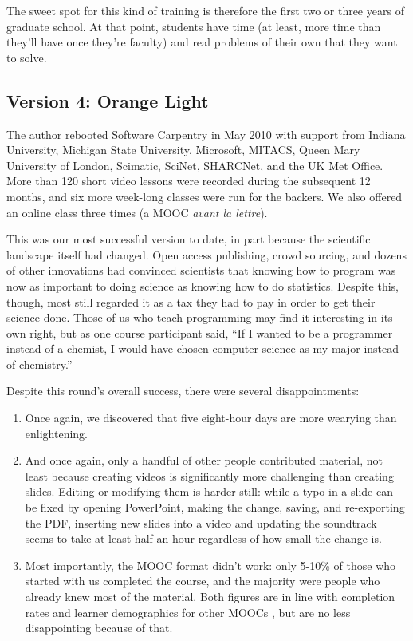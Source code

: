 \documentclass[10pt,a4paper,twocolumn]{article}
\begin{document}
The sweet spot for this kind of training is therefore the first two or
three years of graduate school. At that point, students have time (at
least, more time than they'll have once they're faculty) and real
problems of their own that they want to solve.

\subsection*{Version 4: Orange Light}

The author rebooted Software Carpentry in May 2010 with support from
Indiana University, Michigan State University, Microsoft, MITACS, Queen
Mary University of London, Scimatic, SciNet, SHARCNet, and the UK Met
Office. More than 120 short video lessons were recorded during the
subsequent 12 months, and six more week-long classes were run for the
backers. We also offered an online class three times (a MOOC \emph{avant
la lettre}).

This was our most successful version to date, in part because the
scientific landscape itself had changed. Open access publishing, crowd
sourcing, and dozens of other innovations had convinced scientists
that knowing how to program was now as important to doing science as
knowing how to do statistics. Despite this, though, most still
regarded it as a tax they had to pay in order to get their science
done. Those of us who teach programming may find it interesting in its
own right, but as one course participant said, ``If I wanted to be a
programmer instead of a chemist, I would have chosen computer science
as my major instead of chemistry.''

Despite this round's overall success, there were several
disappointments:

\begin{enumerate}

\item
  Once again, we discovered that five eight-hour days are more wearying
  than enlightening.

\item
  And once again, only a handful of other people contributed material,
  not least because creating videos is significantly more challenging
  than creating slides. Editing or modifying them is harder still:
  while a typo in a slide can be fixed by opening PowerPoint, making
  the change, saving, and re-exporting the PDF, inserting new slides
  into a video and updating the soundtrack seems to take at least half
  an hour regardless of how small the change is.

\item
  Most importantly, the MOOC format didn't work: only 5-10\% of those
  who started with us completed the course, and the majority were
  people who already knew most of the material. Both figures are in
  line with completion rates and learner demographics for other MOOCs
  \cite{jordan2013}, but are no less disappointing because of that.

\end{enumerate}
\end{document}
